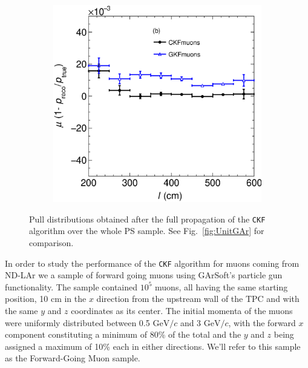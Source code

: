 \begin{figure}[t]
\begin{subfigure}{0.38\textwidth}
         \caption{}
         \label{fig:pBiasVSp_PGun}
     \end{subfigure}
     \begin{subfigure}{0.38\textwidth}
         \centering
         \includegraphics[width=\textwidth]{figures/ch5-KF_NDGAr/FullSample/PGun/pRes/BiaspVSLength_pgun.eps}
         \caption{}
         \label{fig:pBiasVSL_PGun}
     \end{subfigure}

        \caption{Pull distributions obtained after the full propagation of the \texttt{CKF} algorithm over the whole PS sample. See Fig.~\ref{fig:UnitGAr} for comparison.}
        \label{fig:pRes2D_PGun}
\end{figure}
In order to study the performance of the \texttt{CKF} algorithm for muons coming from ND-LAr we a sample of forward going muons using GArSoft's particle gun functionality. The sample contained $10^5$ muons, all having the same starting position, 10 cm in the $x$ direction from the upstream wall of the TPC and with the same $y$ and $z$ coordinates as its center. The initial momenta of the muons were uniformly distributed between 0.5 $\textrm{GeV}/c$ and 3 $\textrm{GeV}/c$, with the forward $x$ component constituting a minimum of 80\% of the total and the $y$ and $z$ being assigned a maximum of 10\% each in either directions. We'll refer to this sample as the Forward-Going Muon sample.

